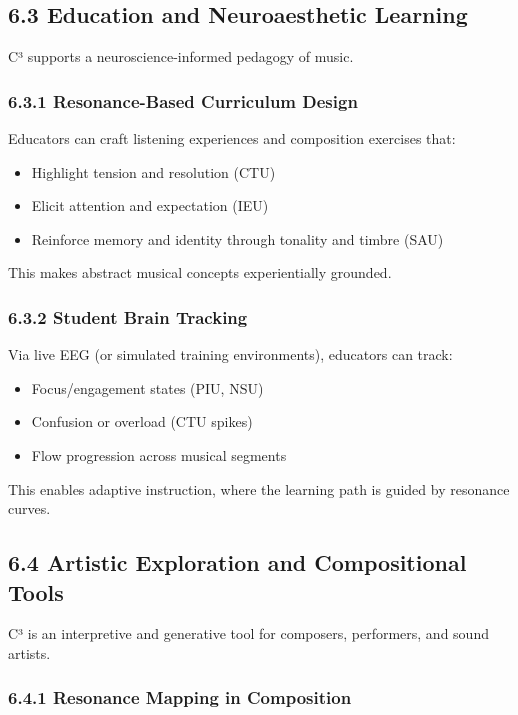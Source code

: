 \subsection*{6.3 Education and Neuroaesthetic Learning}

C³ supports a neuroscience-informed pedagogy of music.

\subsubsection*{6.3.1 Resonance-Based Curriculum Design}

Educators can craft listening experiences and composition exercises that:

\begin{itemize}
    \item Highlight tension and resolution (CTU)
    \item Elicit attention and expectation (IEU)
    \item Reinforce memory and identity through tonality and timbre (SAU)
\end{itemize}

This makes abstract musical concepts experientially grounded.

\subsubsection*{6.3.2 Student Brain Tracking}

Via live EEG (or simulated training environments), educators can track:

\begin{itemize}
    \item Focus/engagement states (PIU, NSU)
    \item Confusion or overload (CTU spikes)
    \item Flow progression across musical segments
\end{itemize}

This enables adaptive instruction, where the learning path is guided by resonance curves.

\subsection*{6.4 Artistic Exploration and Compositional Tools}

C³ is an interpretive and generative tool for composers, performers, and sound artists.

\subsubsection*{6.4.1 Resonance Mapping in Composition}

